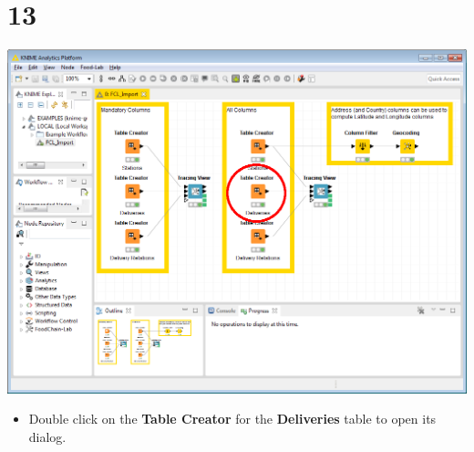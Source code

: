 \documentclass{beamer}
\begin{document}
\section{13}
\begin{frame}
	\begin{center}
  		\includegraphics[height=0.6\textheight]{13.png}
	\end{center}
	\begin{itemize}
		\item Double click on the \textbf{Table Creator} for the \textbf{Deliveries} table to open its dialog.
	\end{itemize}
\end{frame}
\end{document}
